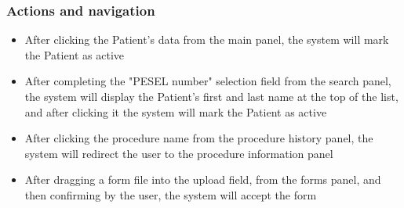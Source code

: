 \subsubsection{Actions and navigation}
\begin{itemize}
    \item After clicking the Patient's data from the main panel, the system will mark the Patient as active
    \item After completing the "PESEL number" selection field from the search panel, the system will display the Patient's first and last name at the top of the list, and after clicking it the system will mark the Patient as active
    \item After clicking the procedure name from the procedure history panel, the system will redirect the user to the procedure information panel
    \item After dragging a form file into the upload field, from the forms panel, and then confirming by the user, the system will accept the form
\end{itemize}
